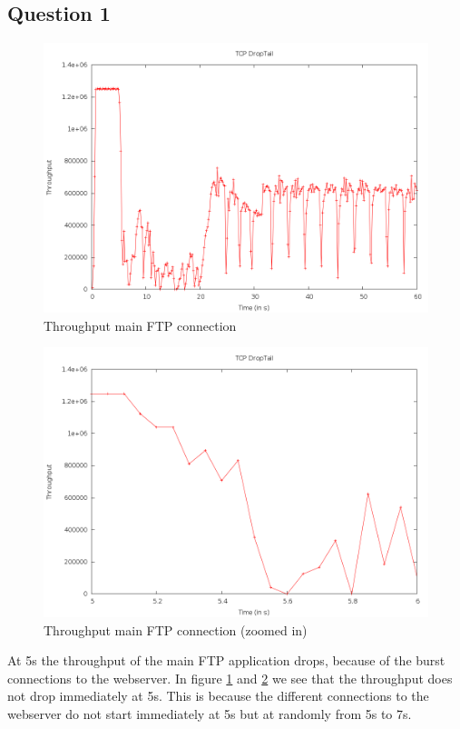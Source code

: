 \documentclass[11pt,a4paper]{article}
\begin{document}
\subsection{Question 1}
\begin{figure}[h!]
 \centering
 \includegraphics[width = 0.9\linewidth]{./ex2-part1-tp.png}
 \caption{Throughput main FTP connection}
 \label{fig:Q21}
\end{figure}
\begin{figure}[h!]
 \centering
 \includegraphics[width = 0.9\linewidth]{./ex2-part1-zoom.png}
 \caption{Throughput main FTP connection (zoomed in)}
 \label{fig:Q211}
\end{figure}

At 5s the throughput of the main FTP application drops, because of the burst connections to the 
webserver. In figure \ref{fig:Q21} and \ref{fig:Q211} we see that the throughput does not drop
immediately at 5s. This is because the different connections to the webserver do not start
immediately at 5s but at randomly from 5s to 7s.
\end{document}
